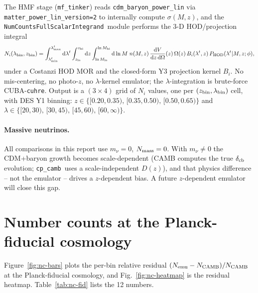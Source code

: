 \documentclass[a4paper, 11pt]{article}
\newcommand{\cp}{\texttt{cp\_camb}}
\newcommand{\mftinker}{\texttt{mf\_tinker}}
\newcommand{\ncfull}{\texttt{NumCountsFullScalarIntegrand}}
\begin{document}
The HMF stage (\mftinker) reads
\texttt{cdm\_baryon\_power\_lin} via \texttt{matter\_power\_lin\_version=2}
to internally compute $\sigma(M, z)$, and the
\ncfull\ module performs the 3-D HOD/projection integral
\[
  N_i(\lambda_{\rm bin}, z_{\rm bin})
  = \int_{\lambda_{\min}^t}^{\lambda_{\max}^t} \mathrm{d}\lambda^t
    \int_{z_{\rm lo}}^{z_{\rm hi}} \mathrm{d}z
    \int_{\ln M_{\rm lo}}^{\ln M_{\rm hi}} \mathrm{d}\ln M\;
    n(M, z)\,\frac{\mathrm{d}V}{\mathrm{d}z\,\mathrm{d}\Omega}(z)\,
    \Omega(z)\,B_i(\lambda^t, z)\,P_{\rm HOD}(\lambda^t | M, z; \phi),
\]
under a Costanzi HOD MOR and the closed-form Y3 projection kernel
$B_i$. No mis-centering, no photo-$z$, no $\lambda$-kernel emulator;
the $\lambda$-integration is brute-force CUBA-\texttt{cuhre}. Output
is a $(3 \times 4)$ grid of $N_i$ values, one per
$(z_{\rm bin}, \lambda_{\rm bin})$ cell, with DES Y1 binning:
$z \in \{[0.20, 0.35),\,[0.35, 0.50),\,[0.50, 0.65)\}$ and
$\lambda \in \{[20, 30),\,[30, 45),\,[45, 60),\,[60, \infty)\}$.

\paragraph{Massive neutrinos.} All comparisons in this report use
$m_\nu = 0$, $N_{\rm mass} = 0$. With $m_\nu \neq 0$ the CDM+baryon
growth becomes scale-dependent (CAMB computes the true
$\delta_{\rm cb}$ evolution; \cp\ uses a scale-independent $D(z)$),
and that physics difference -- not the emulator -- drives a
$z$-dependent bias. A future $z$-dependent emulator will close this
gap.

\section{Number counts at the Planck-fiducial cosmology}
\label{sec:nc-fiducial}


Figure~\ref{fig:nc-bars} plots the per-bin relative residual
$(N_{\rm emu} - N_{\rm CAMB}) / N_{\rm CAMB}$ at the Planck-fiducial
cosmology, and Fig.~\ref{fig:nc-heatmap} is the residual heatmap.
Table~\ref{tab:nc-fid} lists the 12 numbers.
\end{document}
